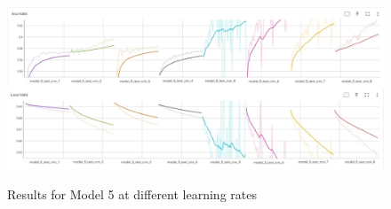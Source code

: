 






\begin{center}
    \begin{figure}[!h]
        \centering
        \includegraphics[width=\textwidth]{images/exp1_acc5+loss5.jpg}
        \label{fig:exp1_model5}
        \caption{Results for Model 5 at different learning rates}
    \end{figure}
\end{center}


